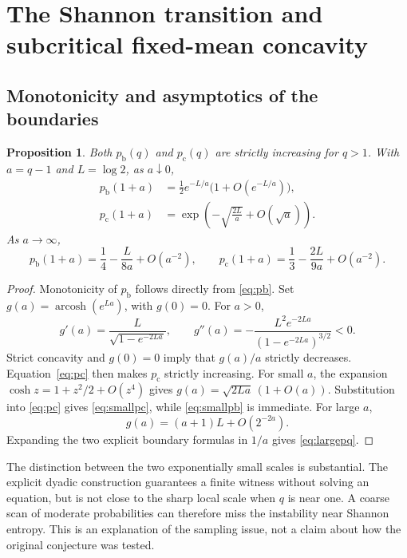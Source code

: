 \documentclass[11pt]{article}
\numberwithin{equation}{section}
\newtheorem{proposition}[theorem]{Proposition}
\theoremstyle{definition}
\theoremstyle{remark}
\newcommand{\pb}{p_{\mathrm b}}
\newcommand{\pc}{p_{\mathrm c}}
\newcommand{\arcosh}{\operatorname{arcosh}}
\begin{document}
\section{The Shannon transition and subcritical fixed-mean concavity}
\subsection{Monotonicity and asymptotics of the boundaries}
\begin{proposition}\label{prop:asymptotics}
Both $\pb(q)$ and $\pc(q)$ are strictly increasing for $q>1$. With
$a=q-1$ and $L=\log2$, as $a\downarrow0$,
\begin{align}
 \pb(1+a)&=\frac12e^{-L/a}\bigl(1+O(e^{-L/a})\bigr),\label{eq:smallpb}\\
 \pc(1+a)&=\exp\left(-\sqrt{\frac{2L}{a}}+O(\sqrt a)\right).
 \label{eq:smallpc}
\end{align}
As $a\to\infty$,
\begin{equation}
 \pb(1+a)=\frac14-\frac{L}{8a}+O(a^{-2}),\qquad
 \pc(1+a)=\frac13-\frac{2L}{9a}+O(a^{-2}).\label{eq:largepq}
\end{equation}
\end{proposition}
\begin{proof}
Monotonicity of $\pb$ follows directly from \eqref{eq:pb}. Set
$g(a)=\arcosh(e^{La})$, with $g(0)=0$. For $a>0$,
\[
 g'(a)=\frac{L}{\sqrt{1-e^{-2La}}},\qquad
 g''(a)=-\frac{L^2e^{-2La}}{(1-e^{-2La})^{3/2}}<0.
\]
Strict concavity and $g(0)=0$ imply that $g(a)/a$ strictly decreases.
Equation~\eqref{eq:pc} then makes $\pc$ strictly increasing.
For small $a$, the expansion $\cosh z=1+z^2/2+O(z^4)$ gives
$g(a)=\sqrt{2La}\,(1+O(a))$. Substitution into \eqref{eq:pc} gives
\eqref{eq:smallpc}, while \eqref{eq:smallpb} is immediate.
For large $a$,
\[
 g(a)=(a+1)L+O(2^{-2a}).
\]
Expanding the two explicit boundary formulas in $1/a$ gives
\eqref{eq:largepq}.
\end{proof}

\begin{table}[tbp]
\centering

\caption{Numerical boundary values from the exact formulas; the CSV in the
archive retains more digits. For $q=1.01$ the balanced-point instability
requires a half-mean below about $7.6\times10^{-6}$, whereas the simple
boundary-optimizer condition is far more restrictive.}
\label{tab:boundaries}
\end{table}

The distinction between the two exponentially small scales is substantial.
The explicit dyadic construction guarantees a finite witness without solving
an equation, but is not close to the sharp local scale when $q$ is near one.
A coarse scan of moderate probabilities can therefore miss the instability
near Shannon entropy. This is an explanation of the sampling issue, not a
claim about how the original conjecture was tested.
\end{document}
